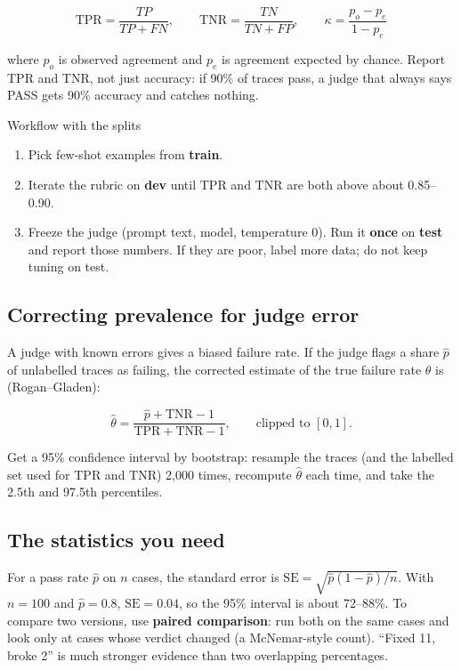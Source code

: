 \documentclass[11pt,a4paper]{article}
\begin{document}
\[
\text{TPR} = \frac{TP}{TP+FN}, \qquad
\text{TNR} = \frac{TN}{TN+FP}, \qquad
\kappa = \frac{p_o - p_e}{1 - p_e}
\]

where $p_o$ is observed agreement and $p_e$ is agreement expected by chance. Report TPR and TNR,
not just accuracy: if 90\% of traces pass, a judge that always says PASS gets 90\% accuracy and
catches nothing.

\begin{keybox}{Workflow with the splits}
\begin{enumerate}[leftmargin=*]
\item Pick few-shot examples from \textbf{train}.
\item Iterate the rubric on \textbf{dev} until TPR and TNR are both above about 0.85--0.90.
\item Freeze the judge (prompt text, model, temperature 0). Run it \textbf{once} on \textbf{test}
and report those numbers. If they are poor, label more data; do not keep tuning on test.
\end{enumerate}
\end{keybox}

\subsection{Correcting prevalence for judge error}

A judge with known errors gives a biased failure rate. If the judge flags a share $\hat p$ of
unlabelled traces as failing, the corrected estimate of the true failure rate $\theta$ is
(Rogan--Gladen):

\[
\hat\theta = \frac{\hat p + \text{TNR} - 1}{\text{TPR} + \text{TNR} - 1},
\qquad \text{clipped to } [0,1].
\]

Get a 95\% confidence interval by bootstrap: resample the traces (and the labelled set used for
TPR and TNR) 2{,}000 times, recompute $\hat\theta$ each time, and take the 2.5th and 97.5th
percentiles.

\subsection{The statistics you need}

For a pass rate $\hat p$ on $n$ cases, the standard error is
$\mathrm{SE} = \sqrt{\hat p (1-\hat p)/n}$. With $n = 100$ and $\hat p = 0.8$, $\mathrm{SE} = 0.04$,
so the 95\% interval is about 72--88\%. To compare two versions, use \textbf{paired comparison}:
run both on the same cases and look only at cases whose verdict changed (a McNemar-style
count). ``Fixed 11, broke 2'' is much stronger evidence than two overlapping percentages.
\end{document}
